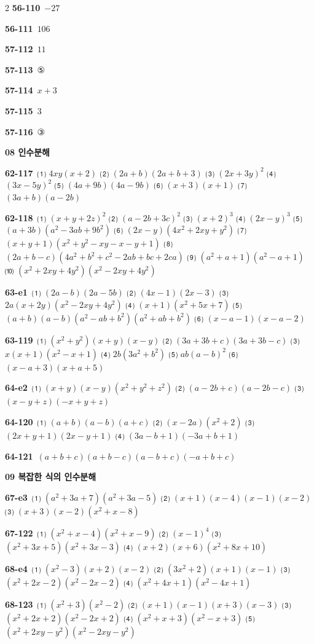 \documentclass[10pt,a4paper]{article}
\begin{document}
\begin{multicols}{2}
\noindent\textbf{56-110}\ $-27$\par
\noindent\textbf{56-111}\ $106$\par
\noindent\textbf{57-112}\ $11$\par
\noindent\textbf{57-113}\ ⑤\par
\noindent\textbf{57-114}\ $x+3$\par
\noindent\textbf{57-115}\ $3$\par
\noindent\textbf{57-116}\ ③\par
\noindent\textbf{08 인수분해}\par\smallskip
\noindent\textbf{62-117}\ ⑴ $4xy(x+2)$ ⑵ $(2a+b)(2a+b+3)$ ⑶ $(2x+3y)^2$ ⑷ $(3x-5y)^2$ ⑸ $(4a+9b)(4a-9b)$ ⑹ $(x+3)(x+1)$ ⑺ $(3a+b)(a-2b)$\par
\noindent\textbf{62-118}\ ⑴ $(x+y+2z)^2$ ⑵ $(a-2b+3c)^2$ ⑶ $(x+2)^3$ ⑷ $(2x-y)^3$ ⑸ $(a+3b)(a^2-3ab+9b^2)$ ⑹ $(2x-y)(4x^2+2xy+y^2)$ ⑺ $(x+y+1)(x^2+y^2-xy-x-y+1)$ ⑻ $(2a+b-c)(4a^2+b^2+c^2-2ab+bc+2ca)$ ⑼ $(a^2+a+1)(a^2-a+1)$ ⑽ $(x^2+2xy+4y^2)(x^2-2xy+4y^2)$\par
\noindent\textbf{63-e1}\ ⑴ $(2a-b)(2a-5b)$ ⑵ $(4x-1)(2x-3)$ ⑶ $2a(x+2y)(x^2-2xy+4y^2)$ ⑷ $(x+1)(x^2+5x+7)$ ⑸ $(a+b)(a-b)(a^2-ab+b^2)(a^2+ab+b^2)$ ⑹ $(x-a-1)(x-a-2)$\par
\noindent\textbf{63-119}\ ⑴ $(x^2+y^2)(x+y)(x-y)$ ⑵ $(3a+3b+c)(3a+3b-c)$ ⑶ $x(x+1)(x^2-x+1)$ ⑷ $2b(3a^2+b^2)$ ⑸ $ab(a-b)^2$ ⑹ $(x-a+3)(x+a+5)$\par
\noindent\textbf{64-e2}\ ⑴ $(x+y)(x-y)(x^2+y^2+z^2)$ ⑵ $(a-2b+c)(a-2b-c)$ ⑶ $(x-y+z)(-x+y+z)$\par
\noindent\textbf{64-120}\ ⑴ $(a+b)(a-b)(a+c)$ ⑵ $(x-2a)(x^2+2)$ ⑶ $(2x+y+1)(2x-y+1)$ ⑷ $(3a-b+1)(-3a+b+1)$\par
\noindent\textbf{64-121}\ $(a+b+c)(a+b-c)(a-b+c)(-a+b+c)$\par
\noindent\textbf{09 복잡한 식의 인수분해}\par\smallskip
\noindent\textbf{67-e3}\ ⑴ $(a^2+3a+7)(a^2+3a-5)$ ⑵ $(x+1)(x-4)(x-1)(x-2)$ ⑶ $(x+3)(x-2)(x^2+x-8)$\par
\noindent\textbf{67-122}\ ⑴ $(x^2+x-4)(x^2+x-9)$ ⑵ $(x-1)^4$ ⑶ $(x^2+3x+5)(x^2+3x-3)$ ⑷ $(x+2)(x+6)(x^2+8x+10)$\par
\noindent\textbf{68-e4}\ ⑴ $(x^2-3)(x+2)(x-2)$ ⑵ $(3x^2+2)(x+1)(x-1)$ ⑶ $(x^2+2x-2)(x^2-2x-2)$ ⑷ $(x^2+4x+1)(x^2-4x+1)$\par
\noindent\textbf{68-123}\ ⑴ $(x^2+3)(x^2-2)$ ⑵ $(x+1)(x-1)(x+3)(x-3)$ ⑶ $(x^2+2x+2)(x^2-2x+2)$ ⑷ $(x^2+x+3)(x^2-x+3)$ ⑸ $(x^2+2xy-y^2)(x^2-2xy-y^2)$\par

\end{multicols}
\end{document}
